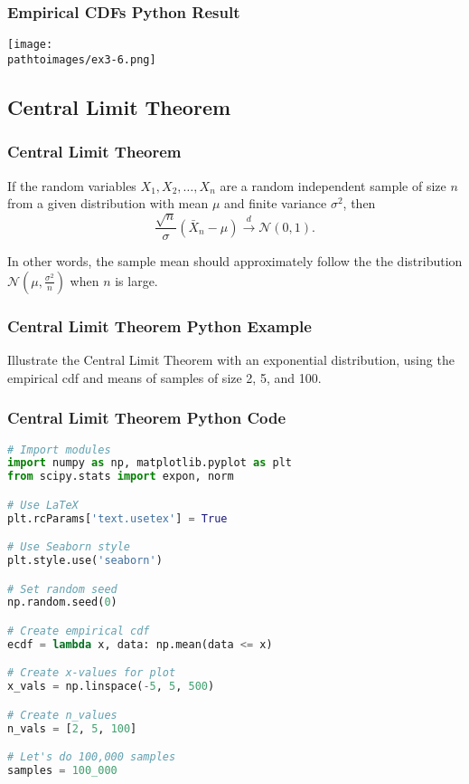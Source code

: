\documentclass{beamer}
\newcommand{\pathtoimages}{/Users/charlesrambo/Desktop/Bootcamp24/Images}
\begin{document}
\begin{frame}[fragile]
\frametitle{Empirical CDFs Python Result}
\begin{center}
\texttt{[image: \\pathtoimages/ex3-6.png]}
\end{center}

\end{frame}

\subsection{Central Limit Theorem}

\begin{frame}
\frametitle{Central Limit Theorem}

\begin{Theorem}
If the random variables $X_1, X_2, \ldots, X_n$ are a random independent sample of size $n$ from a given distribution with mean $\mu$ and finite variance $\sigma^2$, then
$$
\frac{\sqrt{n}}{\sigma}\left(\bar{X}_n - \mu\right)\stackrel{d}{\longrightarrow} \mathcal{N}(0, 1).
$$
\end{Theorem}
In other words, the sample mean should approximately follow the the distribution $\mathcal{N}\left(\mu, \frac{\sigma^2}{n}\right)$ when $n$ is large.
\end{frame}

\begin{frame}[t]
\frametitle{Central Limit Theorem Python Example}
\begin{Example}
Illustrate the Central Limit Theorem with an exponential distribution, using the empirical cdf and means of samples of size 2, 5, and 100.
\end{Example}

\end{frame}

\begin{frame}[fragile]
\frametitle{Central Limit Theorem Python Code}
\begin{lstlisting}[language=Python]
# Import modules
import numpy as np, matplotlib.pyplot as plt
from scipy.stats import expon, norm

# Use LaTeX
plt.rcParams['text.usetex'] = True

# Use Seaborn style
plt.style.use('seaborn')

# Set random seed
np.random.seed(0)

# Create empirical cdf
ecdf = lambda x, data: np.mean(data <= x)

# Create x-values for plot
x_vals = np.linspace(-5, 5, 500)

# Create n_values
n_vals = [2, 5, 100]

# Let's do 100,000 samples
samples = 100_000
\end{lstlisting}

\end{frame}
\end{document}
